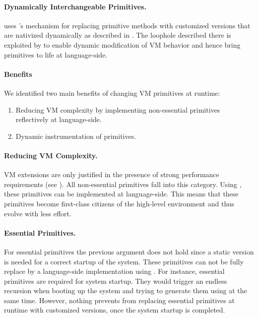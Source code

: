 \paragraph{Dynamically Interchangeable Primitives.}
\WF uses \B's mechanism for replacing primitive methods with customized versions that are nativized dynamically as described in .
The loophole described there is exploited by \WF to enable dynamic modification of VM behavior and hence bring primitives to life at language-side.


\paragraph{Benefits} 
We identified two main benefits of changing VM primitives at runtime:

\begin{enumerate}
	\item Reducing VM complexity by implementing non-essential primitives reflectively at language-side.
	\item Dynamic instrumentation of primitives.
\end{enumerate}

\paragraph{Reducing VM Complexity.}
VM extensions are only justified in the presence of strong performance requirements (see ).
All non-essential primitives fall into this category.
Using \WF, these primitives can be implemented at language-side.
This means that these primitives become first-class citizens of the high-level environment and thus evolve with less effort.

\paragraph{Essential Primitives.}
For essential primitives the previous argument does not hold since a static version is needed for a correct startup of the system.
These primitives can not be fully replace by a language-side implementation using \WF.
For instance, essential primitives are required for system startup.
They would trigger an endless recursion when booting up the system and trying to generate them using \WF at the same time.
However, nothing prevents from replacing essential primitives at runtime with customized versions, once the system startup is completed. 


